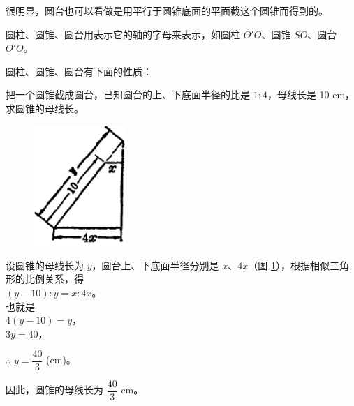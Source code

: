 \begin{enhancedline}
很明显，圆台也可以看做是用平行于圆锥底面的平面截这个圆锥而得到的。

圆柱、圆锥、圆台用表示它的轴的字母来表示，如圆柱 $O'O$、圆锥 $SO$、圆台 $O'O$。

圆柱、圆锥、圆台有下面的性质：




\liti 把一个圆锥截成圆台，已知圆台的上、下底面半径的比是 $1:4$，母线长是 10 cm，求圆锥的母线长。

\begin{figure}
    \centering
    \includegraphics[width=3.5cm]{../pic/ltjh-ch2-32.png}
    \caption{}\label{fig:ltjh-2-32}
\end{figure}

\jie 设圆锥的母线长为 $y$，圆台上、下底面半径分别是 $x$、$4x$（图 \ref{fig:ltjh-2-32}），根据相似三角形的比例关系，得 \\
\hspace*{10em} $(y-10):y = x:4x$。\\
也就是\\
\hspace*{10em} $4(y-10) = y$，\\
\hspace*{10em} $3y = 40$，

$\therefore$ \quad $y = \dfrac{40}{3}$ (cm)。

因此，圆锥的母线长为 $\dfrac{40}{3}$ cm。


\begin{lianxi}





\end{lianxi}
\end{enhancedline}
